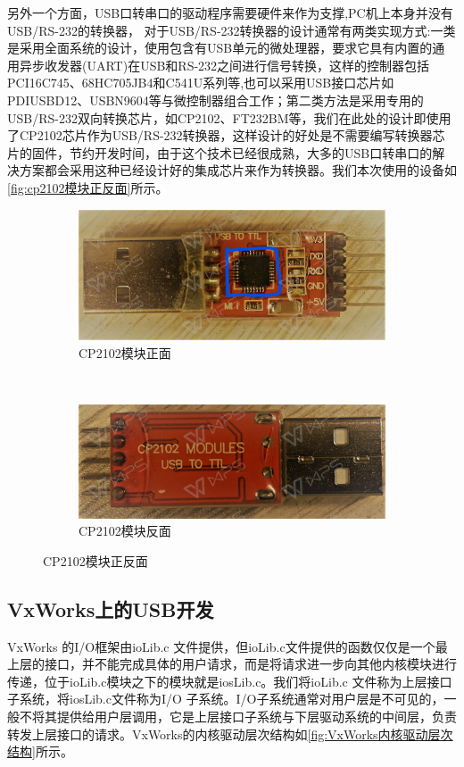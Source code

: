 	
	另外一个方面，USB口转串口的驱动程序需要硬件来作为支撑,PC机上本身并没有USB/RS-232的转换器，
	对于USB/RS-232转换器的设计通常有两类实现方式:一类是采用全面系统的设计，使用包含有USB单元的微处理器，要求它具有内置的通用异步收发器(UART)在USB和RS-232之间进行信号转换，这样的控制器包括PCI16C745、68HC705JB4和C541U系列等\cite{USB与RS232接口转换器的设计},也可以采用USB接口芯片如PDIUSBD12、USBN9604等与微控制器组合工作；第二类方法是采用专用的USB/RS-232双向转换芯片，如CP2102、FT232BM等，我们在此处的设计即使用了CP2102芯片作为USB/RS-232转换器，这样设计的好处是不需要编写转换器芯片的固件，节约开发时间，由于这个技术已经很成熟，大多的USB口转串口的解决方案都会采用这种已经设计好的集成芯片来作为转换器。我们本次使用的设备如\autoref{fig:cp2102模块正反面}所示。
\begin{figure}[h]
\centering
  \begin{subfigure}[b]{0.4\textwidth}
  \includegraphics[width=\textwidth]{./graphics/cp2102Front.pdf}
  \caption{CP2102模块正面}\label{fig:cp2102Front}
  \end{subfigure}
  ~
  \begin{subfigure}[b]{0.4\textwidth}
  \includegraphics[width=\textwidth]{./graphics/cp2102Rear.pdf}
  \caption{CP2102模块反面}\label{fig:cp2102Rear}
  \end{subfigure}
\caption{CP2102模块正反面}\label{fig:cp2102模块正反面}
\end{figure}



\subsection{VxWorks上的USB开发}
	VxWorks 的I/O框架由ioLib.c 文件提供，但ioLib.c文件提供的函数仅仅是一个最上层的接口，并不能完成具体的用户请求，而是将请求进一步向其他内核模块进行传递，位于ioLib.c模块之下的模块就是iosLib.c。我们将ioLib.c 文件称为上层接口子系统，将iosLib.c文件称为I/O 子系统\cite{VxWorks内核解读}。I/O子系统通常对用户层是不可见的，一般不将其提供给用户层调用，它是上层接口子系统与下层驱动系统的中间层，负责转发上层接口的请求。VxWorks的内核驱动层次结构如\autoref{fig:VxWorks内核驱动层次结构}所示。

